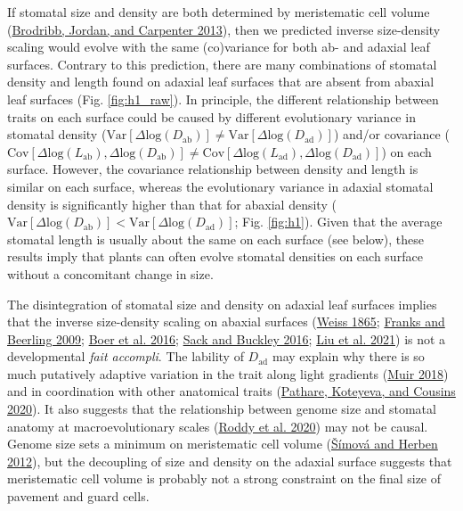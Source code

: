 \documentclass[
  10pt,
]{article}
\begin{document}
If stomatal size and density are both determined by meristematic cell volume (\protect\hyperlink{ref-brodribb_unified_2013}{Brodribb, Jordan, and Carpenter 2013}), then we predicted inverse size-density scaling would evolve with the same (co)variance for both ab- and adaxial leaf surfaces. Contrary to this prediction, there are many combinations of stomatal density and length found on adaxial leaf surfaces that are absent from abaxial leaf surfaces (Fig. \ref{fig:h1_raw}). In principle, the different relationship between traits on each surface could be caused by different evolutionary variance in stomatal density (\(\text{Var}[\Delta \text{log}(D_\text{ab})] \ne \text{Var}[\Delta \text{log}(D_\text{ad})]\)) and/or covariance (\(\text{Cov}[\Delta \text{log}(L_\text{ab}), \Delta \text{log}(D_\text{ab})] \ne \text{Cov}[\Delta \text{log}(L_\text{ad}), \Delta \text{log}(D_\text{ad})]\)) on each surface. However, the covariance relationship between density and length is similar on each surface, whereas the evolutionary variance in adaxial stomatal density is significantly higher than that for abaxial density (\(\text{Var}[\Delta \text{log}(D_\text{ab})] < \text{Var}[\Delta \text{log}(D_\text{ad})]\); Fig. \ref{fig:h1}). Given that the average stomatal length is usually about the same on each surface (see below), these results imply that plants can often evolve stomatal densities on each surface without a concomitant change in size.

The disintegration of stomatal size and density on adaxial leaf surfaces implies that the inverse size-density scaling on abaxial surfaces (\protect\hyperlink{ref-weiss_untersuchungen_1865}{Weiss 1865}; \protect\hyperlink{ref-franks_maximum_2009}{Franks and Beerling 2009}; \protect\hyperlink{ref-de_boer_optimal_2016}{Boer et al. 2016}; \protect\hyperlink{ref-sack_developmental_2016}{Sack and Buckley 2016}; \protect\hyperlink{ref-liu_scaling_2021}{Liu et al. 2021}) is not a developmental \emph{fait accompli}. The lability of \(D_\text{ad}\) may explain why there is so much putatively adaptive variation in the trait along light gradients (\protect\hyperlink{ref-muir_light_2018}{Muir 2018}) and in coordination with other anatomical traits (\protect\hyperlink{ref-pathare_increased_2020}{Pathare, Koteyeva, and Cousins 2020}). It also suggests that the relationship between genome size and stomatal anatomy at macroevolutionary scales (\protect\hyperlink{ref-roddy_scaling_2020}{Roddy et al. 2020}) may not be causal. Genome size sets a minimum on meristematic cell volume (\protect\hyperlink{ref-simova_geometrical_2012}{Šímová and Herben 2012}), but the decoupling of size and density on the adaxial surface suggests that meristematic cell volume is probably not a strong constraint on the final size of pavement and guard cells.
\end{document}
